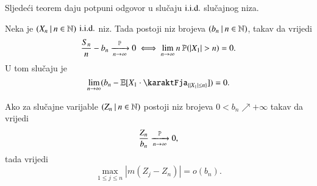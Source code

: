 Sljede\' ci teorem daju potpuni odgovor u slu\v caju $\mathrm{i.i.d.}$ slu\v cajnog niza.

\begin{tm}[W. Feller]   \label{tm:12.9}
    Neka je $({X_n} \: | \: {n \in \mathbb{N}})$ $\mathrm{i.i.d.}$ niz.
    Tada postoji niz brojeva $({b_n} \: | \: {n \in \mathbb{N}})$, takav da vrijedi
    \begin{equation*}
        \frac{S_n}{n} - b_n \xrightarrow[n \to \infty]{\mathbb{P}} 0 \iff \lim\limits_{n \to \infty} n \: \mathbb{P}({|X_1| > n}) = 0.
    \end{equation*}
    U tom slu\v caju je
    \begin{equation*}
        \lim\limits_{n \to \infty} (b_n - \masE [ X_1 \cdot \karaktFja_{\{ |X_1| \leq n \}}]) = 0.
    \end{equation*}
\end{tm}

\begin{zad} \label{zad:12.10}
    Ako za slu\v cajne varijable $({Z_n} \: | \: {n \in \mathbb{N}})$ postoji niz brojeva $0 < b_n \nearrow + \infty$ takav da vrijedi
    \begin{equation*}
        \frac{Z_n}{b_n} \xrightarrow[n \to \infty]{\mathbb{P}} 0,
    \end{equation*}
    tada vrijedi
    \begin{equation*}
        \max\limits_{1 \leq j \leq n} |m(Z_j - Z_n)| = o(b_n).
    \end{equation*}
\end{zad}

